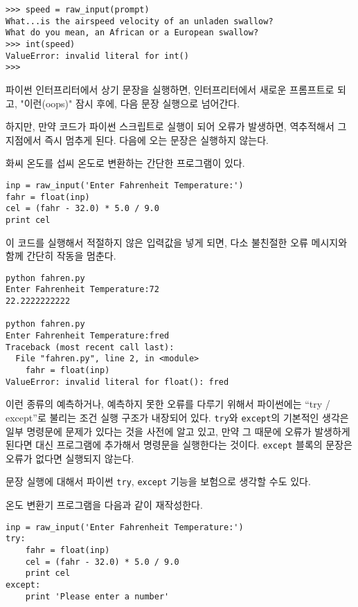 \beforeverb
\begin{verbatim}
>>> speed = raw_input(prompt)
What...is the airspeed velocity of an unladen swallow?
What do you mean, an African or a European swallow?
>>> int(speed)
ValueError: invalid literal for int()
>>>
\end{verbatim}
\afterverb
%
파이썬 인터프리터에서 상기 문장을 실행하면, 
인터프리터에서 새로운 프롬프트로 되고, "이런(oops)" 잠시 후에, 다음 문장 실행으로 넘어간다.

하지만, 만약 코드가 파이썬 스크립트로 실행이 되어 오류가 발생하면,
역추적해서 그 지점에서 즉시 멈추게 된다. 다음에 오는 문장은 실행하지 않는다.


화씨 온도를 섭씨 온도로 변환하는 간단한 프로그램이 있다.


\beforeverb
\begin{verbatim}
inp = raw_input('Enter Fahrenheit Temperature:')
fahr = float(inp)
cel = (fahr - 32.0) * 5.0 / 9.0
print cel
\end{verbatim}
\afterverb
%

이 코드를 실행해서 적절하지 않은 입력값을 넣게 되면, 다소 불친절한 오류 메시지와 함께 간단히 작동을 멈춘다.

\beforeverb
\begin{verbatim}
python fahren.py 
Enter Fahrenheit Temperature:72
22.2222222222

python fahren.py 
Enter Fahrenheit Temperature:fred
Traceback (most recent call last):
  File "fahren.py", line 2, in <module>
    fahr = float(inp)
ValueError: invalid literal for float(): fred
\end{verbatim}
\afterverb
%

이런 종류의 예측하거나, 예측하지 못한 오류를 다루기 위해서 파이썬에는 ``try / except''로 불리는 조건 실행 구조가 내장되어 있다.
{\tt try}와 {\tt except}의 기본적인 생각은 일부 명령문에 문제가 있다는 것을 사전에 알고 있고, 
만약 그 때문에 오류가 발생하게 된다면 대신 프로그램에 추가해서 명령문을 실행한다는 것이다. 
{\tt except} 블록의 문장은 오류가 없다면 실행되지 않는다.

문장 실행에 대해서 파이썬 {\tt try}, {\tt except} 기능을 보험으로 생각할 수도 있다.

온도 변환기 프로그램을 다음과 같이 재작성한다.

\beforeverb
\begin{verbatim}
inp = raw_input('Enter Fahrenheit Temperature:')
try:
    fahr = float(inp)
    cel = (fahr - 32.0) * 5.0 / 9.0
    print cel
except:
    print 'Please enter a number'
\end{verbatim}
\afterverb
%

